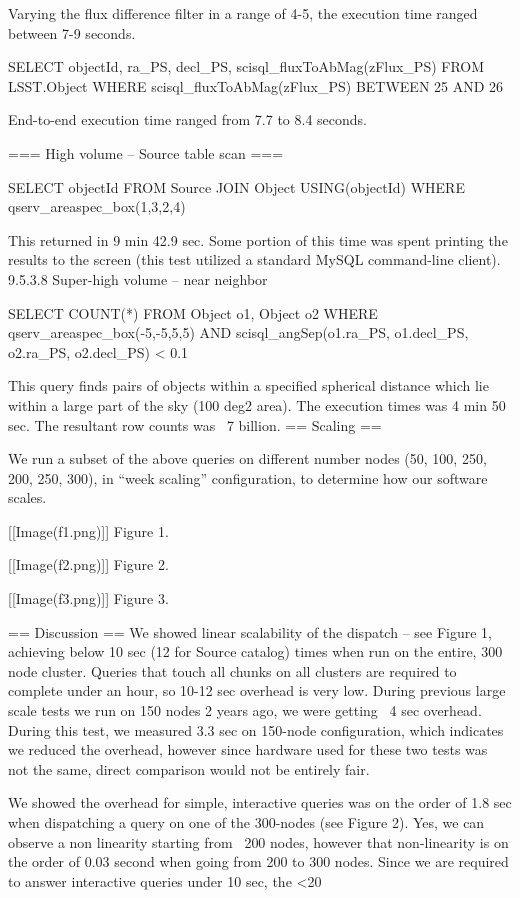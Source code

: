 Varying the flux difference filter in a range of 4-5, the execution time ranged between 7-9 seconds.

{{{
	SELECT	objectId, ra_PS, decl_PS,
		scisql_fluxToAbMag(zFlux_PS)
	FROM	LSST.Object 
	WHERE	scisql_fluxToAbMag(zFlux_PS) BETWEEN 25 AND 26
}}}

End-to-end execution time ranged from 7.7 to 8.4 seconds.

=== High volume – Source table scan ===

{{{
	SELECT	objectId
	FROM	Source
	JOIN	Object USING(objectId) 
	WHERE	qserv_areaspec_box(1,3,2,4)
}}}

This returned in 9 min 42.9 sec. Some portion of this time was spent printing the results to the screen (this test utilized a standard MySQL command-line client).
9.5.3.8 Super-high volume – near neighbor

{{{
	SELECT	COUNT(*) FROM Object o1, Object o2 
	WHERE	qserv_areaspec_box(-5,-5,5,5) 
	AND	scisql_angSep(o1.ra_PS, o1.decl_PS,
			o2.ra_PS, o2.decl_PS) < 0.1
}}}

This query finds pairs of objects within a specified spherical distance which lie within a large part of the sky (100 deg2 area). The execution times was 4 min 50 sec. The resultant row counts was ~7 billion.
== Scaling == 

We run a subset of the above queries on different number nodes (50, 100, 250, 200, 250, 300), in “week scaling” configuration, to determine how our software scales.

[[Image(f1.png)]] Figure 1.


[[Image(f2.png)]] Figure 2.


[[Image(f3.png)]] Figure 3.




== Discussion ==
We showed linear scalability of the dispatch – see Figure 1, achieving below 10 sec (12 for Source catalog) times when run on the entire, 300 node cluster. Queries that touch all chunks on all clusters are required to complete under an hour, so 10-12 sec overhead is very low. During previous large scale tests we run on 150 nodes 2 years ago, we were getting ~4 sec overhead. During this test, we measured 3.3 sec on 150-node configuration, which indicates we reduced the overhead, however since hardware used for these two tests was not the same, direct comparison would not be entirely fair.

We showed the overhead for simple, interactive queries was on the order of 1.8 sec when dispatching a query on one of the 300-nodes (see Figure 2). Yes, we can observe a non linearity starting from ~200 nodes, however that non-linearity is on the order of 0.03 second when going from 200 to 300 nodes. Since we are required to answer interactive queries under 10 sec, the <20%

